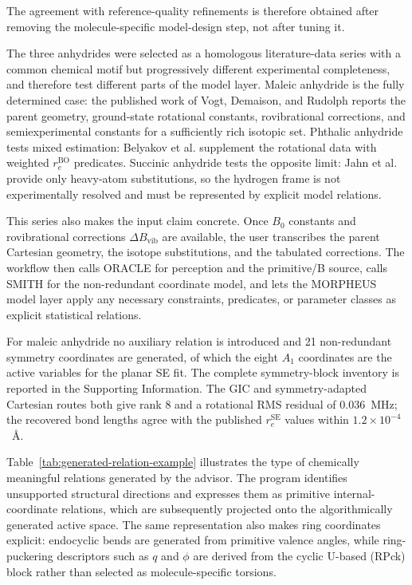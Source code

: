 \documentclass[aip,jcp,reprint,longbibliography,floatfix]{revtex4-2}
\begin{document}
The agreement with reference-quality refinements is therefore obtained after
removing the molecule-specific model-design step, not after tuning it.

The three anhydrides were selected as a homologous literature-data series
with a common chemical motif but progressively
different experimental completeness, and therefore test different parts of
the model layer. Maleic anhydride is the fully determined case: the published
work of Vogt, Demaison, and Rudolph\cite{Vogt2011MaleicAnhydride} reports the
parent geometry, ground-state rotational constants, rovibrational corrections,
and semiexperimental constants for a sufficiently rich isotopic set. Phthalic
anhydride tests mixed estimation: Belyakov et
al.\cite{Belyakov2022PhthalicAnhydride} supplement the rotational data with
weighted $r_e^\mathrm{BO}$ predicates. Succinic anhydride tests the opposite
limit: Jahn et al.\cite{Jahn2020SuccinicAnhydride} provide only heavy-atom
substitutions, so the hydrogen frame is not experimentally resolved and must be
represented by explicit model relations.

This series also makes the input claim concrete. Once $B_0$ constants and
rovibrational corrections $\Delta B_\mathrm{vib}$ are available, the
user transcribes the parent Cartesian geometry, the isotope
substitutions, and the tabulated corrections. The workflow then calls ORACLE
for perception and the primitive/B source, calls SMITH for the non-redundant
coordinate model, and lets the MORPHEUS model layer apply any necessary
constraints, predicates, or parameter classes as explicit statistical
relations.

For maleic anhydride no auxiliary relation is introduced and 21
non-redundant symmetry coordinates are generated, of which the eight $A_1$
coordinates are the active variables for the planar SE fit. The complete
symmetry-block inventory is reported in the Supporting Information.
The GIC and symmetry-adapted Cartesian routes both give rank 8 and a rotational RMS
residual of 0.036~MHz; the recovered bond lengths agree with the published
$r_e^\mathrm{SE}$ values within $1.2\times10^{-4}$~\AA.

Table~\ref{tab:generated-relation-example} illustrates the type of chemically
meaningful relations generated by the advisor. The program
identifies unsupported structural directions and expresses them as primitive
internal-coordinate relations, which are subsequently projected onto the
algorithmically generated active space. The same representation also makes
ring coordinates explicit: endocyclic bends are generated from primitive
valence angles, while ring-puckering descriptors such as $q$ and $\phi$ are
derived from the cyclic U-based (RPck) block rather than selected as
molecule-specific torsions.
\end{document}
